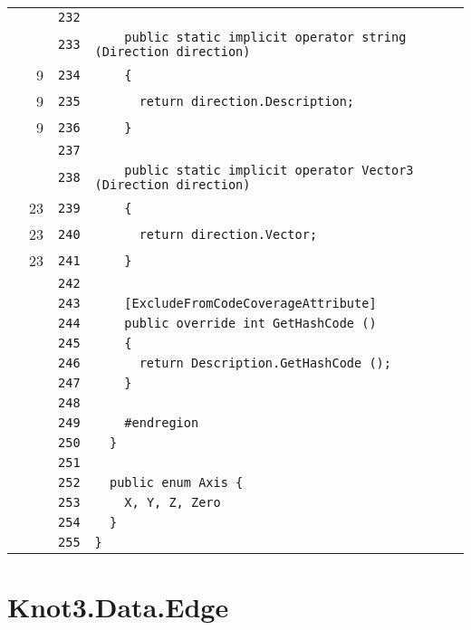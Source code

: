 \documentclass[a4paper,10pt]{article}
\begin{document}
\begin{longtable}[l]{lrrl}
\cellcolor{gray} &  & \verb~232~ & \verb~~\\
\cellcolor{gray} &  & \verb~233~ & \verb~    public static implicit operator string (Direction direction)~\\
\cellcolor{green} & 9 & \verb~234~ & \verb~    {~\\
\cellcolor{green} & 9 & \verb~235~ & \verb~      return direction.Description;~\\
\cellcolor{green} & 9 & \verb~236~ & \verb~    }~\\
\cellcolor{gray} &  & \verb~237~ & \verb~~\\
\cellcolor{gray} &  & \verb~238~ & \verb~    public static implicit operator Vector3 (Direction direction)~\\
\cellcolor{green} & 23 & \verb~239~ & \verb~    {~\\
\cellcolor{green} & 23 & \verb~240~ & \verb~      return direction.Vector;~\\
\cellcolor{green} & 23 & \verb~241~ & \verb~    }~\\
\cellcolor{gray} &  & \verb~242~ & \verb~~\\
\cellcolor{gray} &  & \verb~243~ & \verb~    [ExcludeFromCodeCoverageAttribute]~\\
\cellcolor{gray} &  & \verb~244~ & \verb~    public override int GetHashCode ()~\\
\cellcolor{gray} &  & \verb~245~ & \verb~    {~\\
\cellcolor{gray} &  & \verb~246~ & \verb~      return Description.GetHashCode ();~\\
\cellcolor{gray} &  & \verb~247~ & \verb~    }~\\
\cellcolor{gray} &  & \verb~248~ & \verb~~\\
\cellcolor{gray} &  & \verb~249~ & \verb~    #endregion~\\
\cellcolor{gray} &  & \verb~250~ & \verb~  }~\\
\cellcolor{gray} &  & \verb~251~ & \verb~~\\
\cellcolor{gray} &  & \verb~252~ & \verb~  public enum Axis {~\\
\cellcolor{gray} &  & \verb~253~ & \verb~    X, Y, Z, Zero~\\
\cellcolor{gray} &  & \verb~254~ & \verb~  }~\\
\cellcolor{gray} &  & \verb~255~ & \verb~}~\\
\end{longtable}
\newpage
\section{Knot3.Data.Edge}
\end{document}
